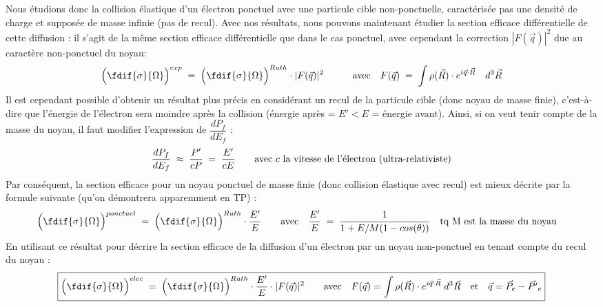 Nous étudions donc la collision élastique d'un électron ponctuel avec une particule cible non-ponctuelle, caractérisée pas une densité de charge et supposée de masse infinie (pas de recul). Avec nos résultats, nous pouvons maintenant étudier la section efficace différentielle de cette diffusion : il s'agit de la même section efficace différentielle que dans le cas ponctuel, avec cependant la correction $|F(\vec{q})|^2$ due au caractère non-ponctuel du noyau:
\begin{equation*}
    \Big( \fdif{\sigma}{\Omega} \Big)^{exp}
    \eq
    \Big( \fdif{\sigma}{\Omega} \Big)^{Ruth}
    \cdot |F(\vec{q})|^2
    \qquad \quad \text{avec} \quad
    F(\vec{q}) \eq \int 
    \rho(\vec{R}) \cdot e^{i\vec{q} \cdot\vec{R}}
    \quad d^3\vec{R}
\end{equation*}
Il est cependant possible d'obtenir un résultat plus précis en considérant un recul de la particule cible (donc noyau de masse finie), c'est-à-dire que l'énergie de l'électron sera moindre après la collision (énergie après = $E'<E$ = énergie avant). Ainsi, si on veut tenir compte de la masse du noyau, il faut modifier l'expression de $\dfrac{dP_f}{dE_f}$ :
\begin{equation*}
    \dfrac{dP_f}{dE_f} \;\approx\; \dfrac{P'}{cP} \; = \; \dfrac{E'}{cE}
    \qquad \text{avec $c$ la vitesse de l'électron (ultra-relativiste)}
\end{equation*}
Par conséquent, la section efficace pour un noyau ponctuel de masse finie (donc collision élastique avec recul) est mieux décrite par la formule suivante (qu'on démontrera apparemment en TP) :
\begin{equation*}
    \Big( \fdif{\sigma}{\Omega} \Big)^{ponctuel}
    \eq
    \Big( \fdif{\sigma}{\Omega} \Big)^{Ruth}
    \cdot \dfrac{E'}{E}
    \qquad \text{avec} \quad
    \dfrac{E'}{E} \eq
    \dfrac{1}{1+E/M(1-cos(\theta))} 
    \quad \text{tq M est la masse du noyau} \quad 
\end{equation*}
En utilisant ce résultat pour décrire la section efficace de la diffusion d'un électron par un noyau non-ponctuel en tenant compte du recul du noyau :
\begin{equation*}
\boxed{
    \Big( \fdif{\sigma}{\Omega} \Big)^{elec}
    \eq
    \Big( \fdif{\sigma}{\Omega} \Big)^{Ruth}
    \cdot \dfrac{E'}{E}
    \cdot |F(\vec{q})|^2
    \qquad \text{avec} \quad 
     F(\vec{q}) = \int 
    \rho(\vec{R}) \cdot e^{i\vec{q} \cdot\vec{R}}
    \; d^3\vec{R}
    \quad \text{et} \quad
    \vec{q} = \vec{P}_e - \vec{P'}_e
}
\end{equation*}
